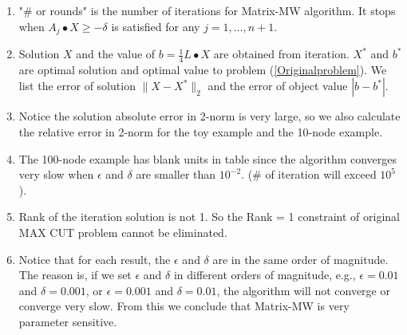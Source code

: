 \documentclass[12pt]{article}
\begin{document}
\begin{enumerate}
\item
"\# or rounds" is the number of iterations for Matrix-MW algorithm. It stops when $A_j \bullet X  \geqslant -\delta$ is satisfied for any $j = 1, \dots, n+1$. 

\item
Solution $X$ and the value of $b = \frac{1}{4} L \bullet X$ are obtained from iteration. $X^*$ and $b^*$ are optimal solution and optimal value to problem (\ref{Originalproblem}). We list the error of solution $\|X- X^*\|_2$ and the error of object value $|b - b^*|$.

\item Notice the solution absolute error in 2-norm is very large, so we also calculate the relative error in 2-norm for the toy example and the 10-node example.


\item
The 100-node example has blank units in table since the algorithm converges very slow when $\epsilon$ and $\delta$ are smaller than $10^{-2}$. (\# of iteration will exceed $10^{5}$ ). 

\item
Rank of the iteration solution is not 1. So the Rank = 1 constraint of original MAX CUT problem cannot be eliminated.


\item 
Notice that for each result, the $\epsilon$ and $\delta$ are in the same order of magnitude. The reason is, if we set $\epsilon$ and $\delta$ in different orders of magnitude, e.g., $\epsilon = 0.01$ and $\delta = 0.001$, or $\epsilon = 0.001$ and $\delta = 0.01$, the algorithm will not converge or converge very slow. From this we conclude that Matrix-MW is very parameter sensitive.

\end{enumerate}
\end{document}
